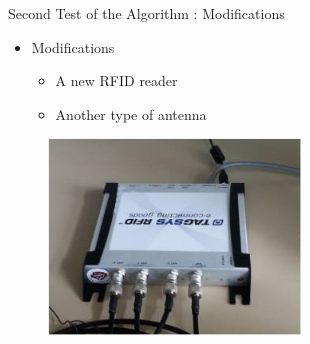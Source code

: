\documentclass[utf8,compress]{beamer}
\begin{document}
\begin{frame}[containsverbatim]{Second Test of the Algorithm : Modifications}
 \begin{itemize}
    \item Modifications 
 \begin{itemize}
    \item A new RFID reader 
     \item Another type of antenna 
    \end{itemize}
    \end{itemize}
    \begin{figure}[h]
        \includegraphics[width=0.6\textwidth]{lecteur.jpg}
    \end{figure}
\end{frame}
\end{document}
